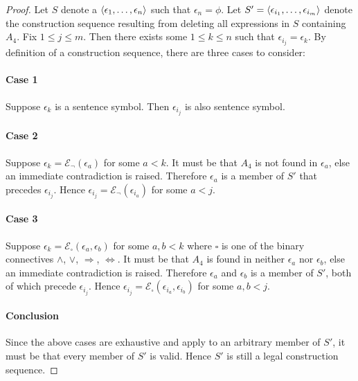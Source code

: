 \documentclass{report}
\begin{document}
  \begin{proof}


    Let $S$ denote a 
      $\left< \epsilon_1, \ldots, \epsilon_n \right>$ such that $\epsilon_n = \phi$.
    Let $S' = \left< \epsilon_{i_1}, \ldots, \epsilon_{i_m} \right>$ denote the construction
      sequence resulting from deleting all expressions in $S$ containing $A_4$.
    Fix $1 \leq j \leq m$.
    Then there exists some $1 \leq k \leq n$ such that
      $\epsilon_{i_j} = \epsilon_k$.
    By definition of a construction sequence, there are three cases to consider:

    \paragraph{Case 1}%

      Suppose $\epsilon_k$ is a sentence symbol.
      Then $\epsilon_{i_j}$ is also sentence symbol.

    \paragraph{Case 2}%

      Suppose $\epsilon_k = \mathcal{E}_{\neg}(\epsilon_a)$ for some $a < k$.
      It must be that $A_4$ is not found in $\epsilon_a$, else an immediate
        contradiction is raised.
      Therefore $\epsilon_a$ is a member of $S'$ that precedes $\epsilon_{i_j}$.
      Hence $\epsilon_{i_j} = \mathcal{E}_{\neg}(\epsilon_{i_a})$ for some
        $a < j$.

    \paragraph{Case 3}%

      Suppose $\epsilon_k = \mathcal{E}_{\square}(\epsilon_a, \epsilon_b)$ for
        some $a, b < k$ where $\square$ is one of the binary connectives
        $\land$, $\lor$, $\Rightarrow$, $\Leftrightarrow$.
      It must be that $A_4$ is found in neither $\epsilon_a$ nor $\epsilon_b$,
        else an immediate contradiction is raised.
      Therefore $\epsilon_a$ and $\epsilon_b$ is a member of $S'$, both of which
        precede $\epsilon_{i_j}$.
      Hence
        $\epsilon_{i_j} = \mathcal{E}_{\square}(\epsilon_{i_a}, \epsilon_{i_b})$
        for some $a, b < j$.

    \paragraph{Conclusion}%

      Since the above cases are exhaustive and apply to an arbitrary member of
        $S'$, it must be that every member of $S'$ is valid.
      Hence $S'$ is still a legal construction sequence.

  \end{proof}
\end{document}
